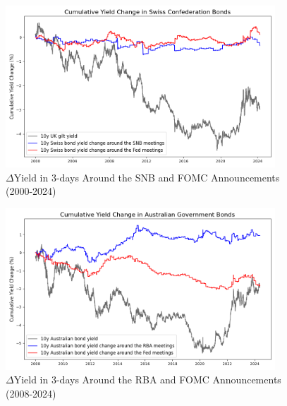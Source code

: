 \begin{figure}[!htbp]
    \centering
    \caption{$\Delta$Yield in 3-days Around the SNB and FOMC Announcements (2000-2024)}\includegraphics[width=0.9\textwidth]{figures/2000_swiss_bonds_figure1a.png}

    \label{fig:snb2000}
\end{figure}

\FloatBarrier



\begin{figure}[!htbp]
    \centering
    \caption{$\Delta$Yield in 3-days Around the RBA and FOMC Announcements (2008-2024)}    \includegraphics[width=0.9\textwidth]{figures/2008_australian_bonds_figure1a.png}

    \label{fig:rba2008}
\end{figure}

